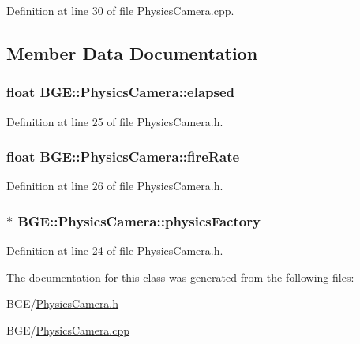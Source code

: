 Definition at line 30 of file Physics\-Camera.\-cpp.



\subsection{Member Data Documentation}
\hypertarget{class_b_g_e_1_1_physics_camera_acc9a82193c98fbb3585924c59d195f69}{
\subsubsection[{elapsed}]{\setlength{\rightskip}{0pt plus 5cm}float B\-G\-E\-::\-Physics\-Camera\-::elapsed}}\label{class_b_g_e_1_1_physics_camera_acc9a82193c98fbb3585924c59d195f69}


Definition at line 25 of file Physics\-Camera.\-h.

\hypertarget{class_b_g_e_1_1_physics_camera_aa57b37765c35f6e1e00b790b4292e719}{
\subsubsection[{fire\-Rate}]{\setlength{\rightskip}{0pt plus 5cm}float B\-G\-E\-::\-Physics\-Camera\-::fire\-Rate}}\label{class_b_g_e_1_1_physics_camera_aa57b37765c35f6e1e00b790b4292e719}


Definition at line 26 of file Physics\-Camera.\-h.

\hypertarget{class_b_g_e_1_1_physics_camera_ad096e2c076c89efb09733aaaf707a7c0}{
\subsubsection[{physics\-Factory}]{$\ast$ B\-G\-E\-::\-Physics\-Camera\-::physics\-Factory}}\label{class_b_g_e_1_1_physics_camera_ad096e2c076c89efb09733aaaf707a7c0}


Definition at line 24 of file Physics\-Camera.\-h.



The documentation for this class was generated from the following files\-:\begin{DoxyCompactItemize}
\item 
B\-G\-E/\hyperlink{_physics_camera_8h}{Physics\-Camera.\-h}\item 
B\-G\-E/\hyperlink{_physics_camera_8cpp}{Physics\-Camera.\-cpp}\end{DoxyCompactItemize}
